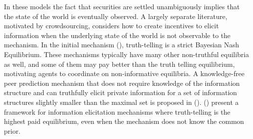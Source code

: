 In these models the fact that securities are settled unambiguously implies that the state of the world is eventually observed.
A largely separate literature, motivated by crowdsourcing, considers how to create incentives to elicit information when the underlying state of the world is not observable to the mechanism. 
In the initial mechanism (\cite{prelec2004bayesian,miller2005eliciting}), truth-telling is a strict Bayesian Nash Equilibrium. These mechanisms typically have many other non-truthful equilibria as well, and some of them may pay better than the truth telling equilibrium, motivating agents to coordinate on non-informative equilibria.
A knowledge-free peer prediction mechanism that does not require knowledge of the information structure and can truthfully elicit private information for a set of information structures slightly smaller than the maximal set is proposed in (\cite{zhang2014elicitability}).
(\cite{kong2016framework}) present a framework for information elicitation mechanisms where truth-telling is the highest paid equilibrium, even when the mechanism does not know the common prior.













